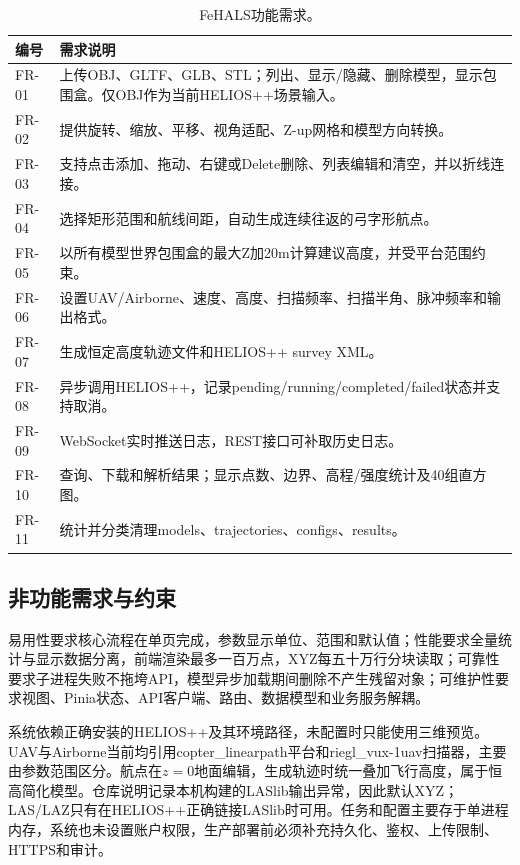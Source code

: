 \documentclass[a4paper,fleqn]{cas-sc}
\begin{document}
\begin{table}[htbp]
  \centering
  \caption{FeHALS功能需求。}
  \begin{tabular}{p{2.5cm}p{10cm}}
    \toprule
    编号 & 需求说明 \\
    \midrule
    FR-01 & 上传OBJ、GLTF、GLB、STL；列出、显示/隐藏、删除模型，显示包围盒。仅OBJ作为当前HELIOS++场景输入。 \\
    FR-02 & 提供旋转、缩放、平移、视角适配、Z-up网格和模型方向转换。 \\
    FR-03 & 支持点击添加、拖动、右键或Delete删除、列表编辑和清空，并以折线连接。 \\
    FR-04 & 选择矩形范围和航线间距，自动生成连续往返的弓字形航点。 \\
    FR-05 & 以所有模型世界包围盒的最大Z加20m计算建议高度，并受平台范围约束。 \\
    FR-06 & 设置UAV/Airborne、速度、高度、扫描频率、扫描半角、脉冲频率和输出格式。 \\
    FR-07 & 生成恒定高度轨迹文件和HELIOS++ survey XML。 \\
    FR-08 & 异步调用HELIOS++，记录pending/running/completed/failed状态并支持取消。 \\
    FR-09 & WebSocket实时推送日志，REST接口可补取历史日志。 \\
    FR-10 & 查询、下载和解析结果；显示点数、边界、高程/强度统计及40组直方图。 \\
    FR-11 & 统计并分类清理models、trajectories、configs、results。 \\
    \bottomrule
  \end{tabular}
  \label{tab:functions}
\end{table}

\subsection{非功能需求与约束}

易用性要求核心流程在单页完成，参数显示单位、范围和默认值；性能要求全量统计与显示数据分离，前端渲染最多一百万点，XYZ每五十万行分块读取；可靠性要求子进程失败不拖垮API，模型异步加载期间删除不产生残留对象；可维护性要求视图、Pinia状态、API客户端、路由、数据模型和业务服务解耦。

系统依赖正确安装的HELIOS++及其环境路径，未配置时只能使用三维预览。UAV与Airborne当前均引用copter\_linearpath平台和riegl\_vux-1uav扫描器，主要由参数范围区分。航点在$z=0$地面编辑，生成轨迹时统一叠加飞行高度，属于恒高简化模型。仓库说明记录本机构建的LASlib输出异常，因此默认XYZ；LAS/LAZ只有在HELIOS++正确链接LASlib时可用。任务和配置主要存于单进程内存，系统也未设置账户权限，生产部署前必须补充持久化、鉴权、上传限制、HTTPS和审计。
\end{document}
